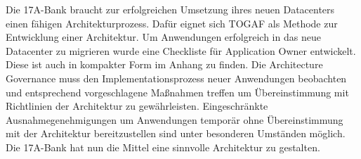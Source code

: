 Die 17A-Bank braucht zur erfolgreichen Umsetzung ihres neuen Datacenters einen fähigen Architekturprozess. Dafür eignet sich TOGAF als Methode zur Entwicklung einer Architektur. Um Anwendungen erfolgreich in das neue Datacenter zu migrieren wurde eine Checkliste für Application Owner entwickelt. Diese ist auch in kompakter Form im Anhang zu finden. Die Architecture Governance muss den Implementationsprozess neuer Anwendungen beobachten und entsprechend vorgeschlagene Maßnahmen treffen um Übereinstimmung mit Richtlinien der Architektur zu gewährleisten. Eingeschränkte Ausnahmegenehmigungen um Anwendungen temporär ohne Übereinstimmung mit der Architektur bereitzustellen sind unter besonderen Umständen möglich. Die 17A-Bank hat nun die Mittel eine sinnvolle Architektur zu gestalten.